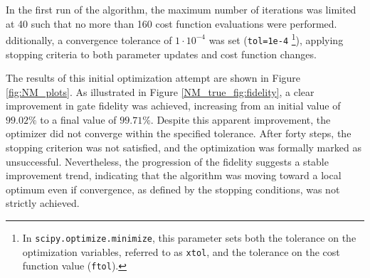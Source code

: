 In the first run of the algorithm, the maximum number of iterations was limited at 40 such that no more than 160 cost function evaluations were performed.
dditionally, a convergence tolerance of $1\cdot10^{-4}$ was set (\texttt{tol=1e-4} \footnote{In \texttt{scipy.optimize.minimize}, this parameter sets both the tolerance on the optimization variables, referred to as \texttt{xtol}, and the tolerance on the cost function value (\texttt{ftol}).}), applying stopping criteria to both parameter updates and cost function changes.

The results of this initial optimization attempt are shown in Figure \ref{fig:NM_plots}. As illustrated in Figure \ref{NM_true_fig:fidelity}, a clear improvement in gate fidelity was achieved, increasing from an initial value of $99.02\%$ to a final value of $99.71\%$.
Despite this apparent improvement, the optimizer did not converge within the specified tolerance. After forty steps, the stopping criterion was not satisfied, and the optimization was formally marked as unsuccessful. 
Nevertheless, the progression of the fidelity suggests a stable improvement trend, indicating that the algorithm was moving toward a local optimum even if convergence, as defined by the stopping conditions, was not strictly achieved.

